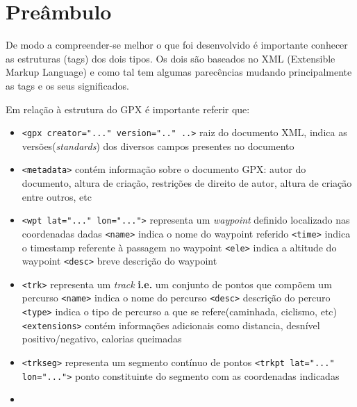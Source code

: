 \documentclass{llncs}
\begin{document}
\section{Preâmbulo}\label{pb}
De modo a compreender-se melhor o que foi desenvolvido é importante conhecer as estruturas (tags) dos dois tipos. Os dois são baseados no XML (Extensible Markup Language) e como tal tem algumas parecências mudando principalmente as tags e os seus significados. 

Em relação à estrutura do GPX é importante referir que:
\begin{itemize}
    \item \verb|<gpx creator="..." version=".." ..>| raiz do documento XML, indica as versões(\textit{standards}) dos diversos campos presentes no documento
    \item \verb|<metadata>| contém informação sobre o documento GPX: autor do documento, altura de criação, restrições de direito de autor, altura de criação entre outros, etc
    \item \verb|<wpt lat="..." lon="...">| representa um \textit{waypoint} definido  localizado nas coordenadas dadas
        \subitem \verb|<name>| indica o nome do waypoint referido
        \subitem \verb|<time>| indica o timestamp referente à passagem no waypoint
        \subitem \verb|<ele>| indica a altitude do waypoint
        \subitem \verb|<desc>| breve descrição do waypoint
    \item \verb|<trk>| representa um \textit{track} \textbf{i.e.} um conjunto de pontos que compõem um percurso
        \subitem \verb|<name>| indica o nome do percurso
        \subitem \verb|<desc>| descrição do percuro
        \subitem \verb|<type>| indica o tipo de percurso a que se refere(caminhada, ciclismo, etc)
        \subitem \verb|<extensions>| contém informações adicionais como distancia, desnível positivo/negativo, calorias queimadas
    \item \verb|<trkseg>| representa um segmento contínuo de pontos
        \subitem \verb|<trkpt lat="..." lon="...">| ponto constituinte do segmento com as coordenadas indicadas
    \item
        
\end{itemize}
\end{document}
